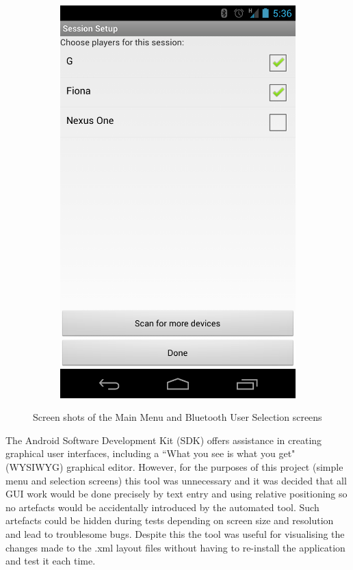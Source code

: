 \begin{figure}
\begin{subfigure}[b]{0.3\textwidth}
\includegraphics[scale=0.15]{userSelection}
\end{subfigure}
\caption{Screen shots of the Main Menu and Bluetooth User Selection screens}
\label{userSelection}
\end{figure}


The Android Software Development Kit (SDK) offers assistance in creating graphical user interfaces, including a ``What you see is what you get" (WYSIWYG) graphical editor. However, for the purposes of this project (simple menu and selection screens) this tool was unnecessary and it was decided that all GUI work would be done precisely by text entry and using relative positioning so no artefacts would be accidentally introduced by the automated tool. Such artefacts could be hidden during tests depending on screen size and resolution and lead to troublesome bugs. Despite this the tool was useful for visualising the changes made to the .xml layout files without having to re-install the application and test it each time.

